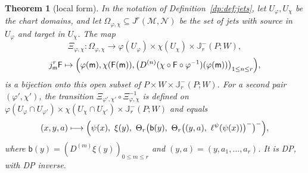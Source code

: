 \documentclass[11pt]{amsart}
\newtheorem{theorem}{Theorem}[section]
\theoremstyle{definition}
\theoremstyle{remark}
\numberwithin{equation}{section}
\theoremstyle{plain}
\theoremstyle{definition}
\theoremstyle{plain}
\begin{document}
\begin{theorem}[local form]\label{dp:thm:jet-local}
In the notation of Definition~\ref{dp:def:jets}, let $U_\varphi,U_\chi$ be the chart domains, and let $\Omega_{\varphi,\chi}\subseteq J^r(\mathcal M,\mathcal N)$ be the set of jets with source in $U_\varphi$ and target in $U_\chi$. The map
\[
 \Xi_{\varphi,\chi}\colon\Omega_{\varphi,\chi}\to\varphi(U_\varphi)\times\chi(U_\chi)\times\mathbb J^-_r(P;W),
\]
\[
 j^r_{\mathsf m}\mathsf F\mapsto\Bigl(\varphi(\mathsf m),\chi(\mathsf F(\mathsf m)),\bigl(D^{(n)}(\chi\circ\mathsf F\circ\varphi^{-1})(\varphi(\mathsf m))\bigr)_{1\le n\le r}\Bigr),
\]
is a bijection onto this open subset of $P\times W\times\mathbb J^-_r(P;W)$. For a second pair $(\varphi',\chi')$, the transition $\Xi_{\varphi',\chi'}\circ\Xi_{\varphi,\chi}^{-1}$ is defined on $\varphi(U_\varphi\cap U_{\varphi'})\times\chi(U_\chi\cap U_{\chi'})\times\mathbb J^-_r(P;W)$ and equals
\begin{equation}\label{dp:13:eq:transition}
 (x,y,a)\longmapsto\Bigl(\psi(x),\ \xi(y),\ \Theta_r\bigl(\mathsf b(y),\ \Theta_r\bigl((y,a),\ \ell^\psi(\psi(x))\bigr)^-\bigr)^-\Bigr),
\end{equation}
where $\mathsf b(y)=(D^{(m)}\xi(y))_{0\le m\le r}$ and $(y,a)=(y,a_1,\dots,a_r)$. It is DP, with DP inverse.
\end{theorem}
\end{document}
